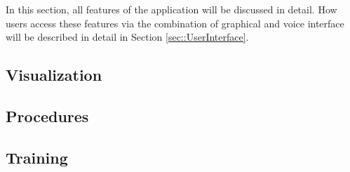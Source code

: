 In this section, all features of the application will be discussed in detail.
How users access these features via the combination of graphical and voice interface will be described in detail in Section \ref{sec::UserInterface}.

\subsection{\label{sec::ImplementationVisualization}Visualization}

\subsection{\label{sec::ImplementationProcedures}Procedures}

\subsection{\label{sec::ImplementationTraining}Training}

